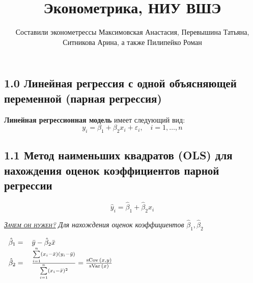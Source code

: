 \documentclass[a0,final]{a0poster}
\title{\textbf{Эконометрика, НИУ ВШЭ}}
\author{Составили эконометрессы Максимовская Анастасия, Перевышина Татьяна, Ситникова Арина, а также Пилипейко Роман}
\DeclareMathOperator{\sVar}{sVar}
\DeclareMathOperator{\sCov}{sCov}
\DeclareMathOperator{\E}{E}
\begin{document}
\begin{minipage}{\textwidth}					%
\maketitle
\end{minipage}
\vspace{1cm}

\begin{multicols}{4}							%
\raggedcolumns							%

\section*{1.0 Линейная регрессия с одной объясняющей переменной (парная регрессия)}
\begin{tcolorbox}[colback=red!5!white,colframe=red!75!black]
\textbf{Линейная регрессионная модель} имеет следующий вид:
\[y_i = \beta_1 +\beta_2x_i + \varepsilon_i, \quad i = 1, \ldots,n\]
\end{tcolorbox}
\subsection*{\textbf{1.1 Метод наименьших квадратов (OLS) для нахождения оценок коэффициентов парной регрессии}}

\[\hat{y}_i=\hat{\beta}_1 +\hat{\beta}_2x_i\]

\underline{\textsc{\textit{Зачем он нужен?}}} \textit{Для нахождения оценок коэффициентов} $\hat{\beta}_1, \hat{\beta}_2$

\begin{center}
\begin{math}
\begin{tabular}{r  l}
$\hat{\beta}_1 =$ & $\bar{y} - \hat{\beta}_2\bar{x}$\\
$\hat{\beta}_2 =$ & $\frac{\sum\limits_{i=1}^n(x_i - \bar{x})(y_i - \bar{y})}{\sum\limits_{i=1}^n(x_i-\bar{x})^2} = \frac{\sCov{(x,y)}}{\sVar{(x)}}$ \\
\end{tabular}
\end{math}
\end{center}


\end{multicols}
\end{document}
